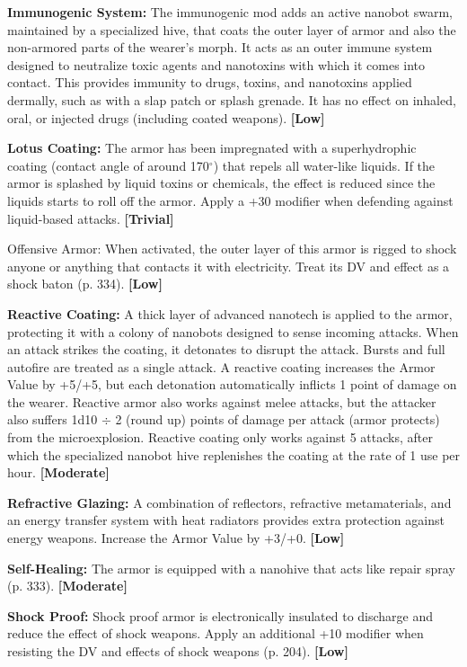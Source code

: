 \textbf{Immunogenic System:} The immunogenic mod adds an active nanobot swarm, maintained by a specialized hive, that coats the outer layer of armor and also the non-armored parts of the wearer’s morph. It acts as an outer immune system designed to neutralize toxic agents and nanotoxins with which it comes into contact. This provides immunity to drugs, toxins, and nanotoxins applied dermally, such as with a slap patch or splash grenade. It has no effect on inhaled, oral, or injected drugs (including coated weapons). \textbf{[Low]} 

\textbf{Lotus Coating:} The armor has been impregnated with a superhydrophic coating (contact angle of around 170$^{\circ}$) that repels all water-like liquids. If the armor is splashed by liquid toxins or chemicals, the effect is reduced since the liquids starts to roll off the armor. Apply a +30 modifier when defending against liquid-based attacks. \textbf{[Trivial]} 

Offensive Armor: When activated, the outer layer of this armor is rigged to shock anyone or anything that contacts it with electricity. Treat its DV and effect as a shock baton (p. 334). \textbf{[Low]} 

\textbf{Reactive Coating:} A thick layer of advanced nanotech is applied to the armor, protecting it with a colony of nanobots designed to sense incoming attacks. When an attack strikes the coating, it detonates to disrupt the attack. Bursts and full autofire are treated as a single attack. A reactive coating increases the Armor Value by +5/+5, but each detonation automatically inflicts 1 point of damage on the wearer. Reactive armor also works against melee attacks, but the attacker also suffers 1d10 $\div$ 2 (round up) points of damage per attack (armor protects) from the microexplosion. Reactive coating only works against 5 attacks, after which the specialized nanobot hive replenishes the coating at the rate of 1 use per hour. \textbf{[Moderate]} 

\textbf{Refractive Glazing:} A combination of reflectors, refractive metamaterials, and an energy transfer system with heat radiators provides extra protection against energy weapons. Increase the Armor Value by +3/+0. \textbf{[Low]} 

\textbf{Self-Healing:} The armor is equipped with a nanohive that acts like repair spray (p. 333). \textbf{[Moderate]} 

\textbf{Shock Proof:} Shock proof armor is electronically insulated to discharge and reduce the effect of shock weapons. Apply an additional +10 modifier when resisting the DV and effects of shock weapons (p. 204). \textbf{[Low]} 

